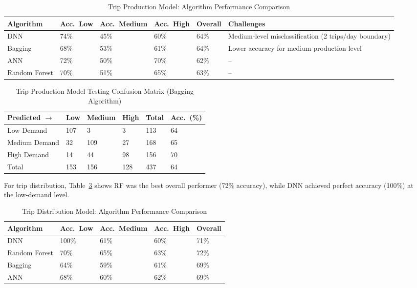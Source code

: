 \documentclass[12pt]{article}
\begin{document}
\begin{table}[H]
\centering
\caption{Trip Production Model: Algorithm Performance Comparison}
\label{tab:production-perf}
\small
\begin{tabular}{p{1.9cm}p{1.5cm}p{1.7cm}p{1.5cm}p{1.5cm}p{4.8cm}}
\toprule
\textbf{Algorithm} & \textbf{Acc.\ Low} & \textbf{Acc.\ Medium} & \textbf{Acc.\ High} & \textbf{Overall} & \textbf{Challenges} \\
\midrule
DNN & 74\% & 45\% & 60\% & 64\% & Medium-level misclassification (2 trips/day boundary) \\
Bagging & 68\% & 53\% & 61\% & 64\% & Lower accuracy for medium production level \\
ANN & 72\% & 50\% & 70\% & 62\% & -- \\
Random Forest & 70\% & 51\% & 65\% & 63\% & -- \\
\bottomrule
\end{tabular}
\end{table}

\begin{table}[H]
\centering
\caption{Trip Production Model Testing Confusion Matrix (Bagging Algorithm)}
\label{tab:production-confusion}
\small
\begin{tabular}{p{3cm}p{2cm}p{2.2cm}p{2cm}p{1.5cm}p{1.8cm}}
\toprule
\textbf{Predicted} $\rightarrow$ & \textbf{Low} & \textbf{Medium} & \textbf{High} & \textbf{Total} & \textbf{Acc.\ (\%)} \\
\midrule
Low Demand & 107 & 3 & 3 & 113 & 64 \\
Medium Demand & 32 & 109 & 27 & 168 & 65 \\
High Demand & 14 & 44 & 98 & 156 & 70 \\
Total & 153 & 156 & 128 & 437 & 64 \\
\bottomrule
\end{tabular}
\end{table}

For trip distribution, Table~\ref{tab:distribution-perf} shows RF was the best
overall performer (72\% accuracy), while DNN achieved perfect accuracy (100\%) at
the low-demand level.

\begin{table}[H]
\centering
\caption{Trip Distribution Model: Algorithm Performance Comparison}
\label{tab:distribution-perf}
\small
\begin{tabular}{p{2.3cm}p{2.4cm}p{2.4cm}p{2.4cm}p{2cm}}
\toprule
\textbf{Algorithm} & \textbf{Acc.\ Low} & \textbf{Acc.\ Medium} & \textbf{Acc.\ High} & \textbf{Overall} \\
\midrule
DNN & 100\% & 61\% & 60\% & 71\% \\
Random Forest & 70\% & 65\% & 63\% & 72\% \\
Bagging & 64\% & 59\% & 61\% & 69\% \\
ANN & 68\% & 60\% & 62\% & 69\% \\
\bottomrule
\end{tabular}
\end{table}
\end{document}
